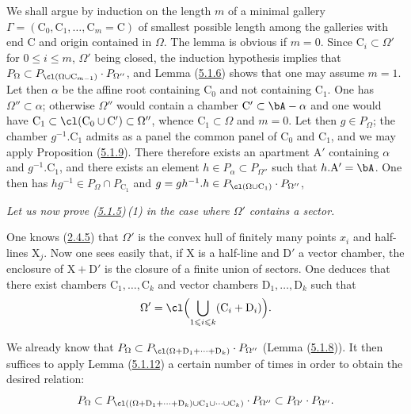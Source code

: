 \documentclass[12pt,a4paper,oneside,english]{smfart}
\makeatletter
\newcommand{\btanchor}[1]{\leavevmode\Hy@raisedlink{\hypertarget{bt:#1}{}}}
\newcommand{\btpageanchor}[1]{\Hy@raisedlink{\hypertarget{p:#1}{}}}
\newcommand{\btref}[1]{\hyperlink{bt:#1}{#1}}
\newcommand{\btpage}[1]{\marginnote{p.~#1}\btpageanchor{#1}}
\newcommand{\pg}[1]{\btpage{#1}}
\theoremstyle{definition}
\theoremstyle{bt}
\makeatother
\begin{document}
We shall argue by induction on the length $m$ of a minimal gallery
$\Gamma=(\mathrm{C}_{0},\mathrm{C}_{1},\dots,\mathrm{C}_{m}=\mathrm{C})$ of
smallest possible length among the galleries with end $\mathrm{C}$ and origin
contained in $\Omega$. The lemma is obvious if $m=0$. Since
$\mathrm{C}_{i}\subset\Omega'$ for $0\leqslant i\leqslant m$, $\Omega'$ being
closed, the induction hypothesis implies that
$P_{\Omega}\subset P_{\cl(\Omega\cup \mathrm{C}_{m-1})}\cdot P_{\Omega''}$, and
Lemma (\btref{5.1.6}) shows that one may assume $m=1$. Let then $\alpha$ be the affine
root containing $\mathrm{C}_{0}$ and not containing $\mathrm{C}_{1}$. One has
$\Omega''\subset\alpha$; otherwise $\Omega''$ would contain a chamber
$\mathrm{C}'\subset\bA-\alpha$ and one would have
$\mathrm{C}_{1}\subset\cl(\mathrm{C}_{0}\cup \mathrm{C}')\subset\Omega''$,
whence $\mathrm{C}_{1}\subset\Omega$ and $m=0$. Let then $g\in P_{\Omega}$; the
chamber $g^{-1}.\mathrm{C}_{1}$ admits as a panel the common panel of
$\mathrm{C}_{0}$ and $\mathrm{C}_{1}$, and we may apply Proposition (\btref{5.1.9}).
There therefore exists an apartment $\mathrm{A}'$ containing $\alpha$ and
$g^{-1}.\mathrm{C}_{1}$, and there exists an element
$h\in P_{\alpha}\subset P_{\Omega''}$ such that $h.\mathrm{A}'=\bA$. One then
has $hg^{-1}\in P_{\Omega}\cap P_{\mathrm{C}_{1}}$ and
$g=gh^{-1}.h\in P_{\cl(\Omega\cup \mathrm{C}_{1})}\cdot P_{\Omega''}$, \qedfr

\pg{87}
\btanchor{5.1.13}
\emph{Let us now prove \textup{(\btref{5.1.5})\,(1)} in the case where $\Omega'$
contains a sector.}

One knows (\btref{2.4.5}) that $\Omega'$ is the convex hull of finitely many points
$x_{i}$ and half-lines $\mathrm{X}_{j}$. Now one sees easily that, if
$\mathrm{X}$ is a half-line and $\mathrm{D}'$ a vector chamber, the enclosure of
$\mathrm{X}+\mathrm{D}'$ is the closure of a finite union of sectors. One
deduces that there exist chambers $\mathrm{C}_{1},\dots,\mathrm{C}_{k}$ and
vector chambers $\mathrm{D}_{1},\dots,\mathrm{D}_{k}$ such that
\[
\Omega'=\cl\Bigl(\bigcup_{1\leqslant i\leqslant k}(\mathrm{C}_{i}+\mathrm{D}_{i})\Bigr).
\]

We already know that
$P_{\Omega}\subset P_{\cl(\Omega+\mathrm{D}_{1}+\dots+\mathrm{D}_{k})}\cdot P_{\Omega''}$
(Lemma (\btref{5.1.8})). It then suffices to apply Lemma (\btref{5.1.12}) a certain number of
times in order to obtain the desired relation:
\[
P_{\Omega}\subset P_{\cl((\Omega+\mathrm{D}_{1}+\dots+\mathrm{D}_{k})\cup \mathrm{C}_{1}\cup\dots\cup \mathrm{C}_{k})}\cdot P_{\Omega''}
\subset P_{\Omega'}\cdot P_{\Omega''}.
\]
\end{document}
